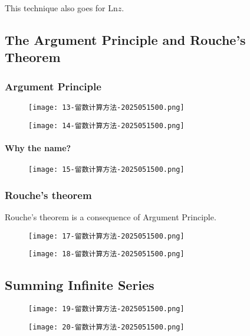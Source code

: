 This technique also goes for $\mathrm{Ln}z$.

\subsection{The Argument Principle and Rouche's Theorem}

\subsubsection{Argument Principle}

\begin{figure}[H]
\centering
\texttt{[image: 13-留数计算方法-2025051500.png]}
\label{}
\end{figure}
\begin{figure}[H]
\centering
\texttt{[image: 14-留数计算方法-2025051500.png]}
\label{}
\end{figure}

\paragraph{Why the name?}

\begin{figure}[H]
\centering
\texttt{[image: 15-留数计算方法-2025051500.png]}
\label{}
\end{figure}

\subsubsection{Rouche's theorem}

Rouche's theorem is a consequence of Argument Principle.

\begin{figure}[H]
\centering
\texttt{[image: 17-留数计算方法-2025051500.png]}
\label{}
\end{figure}
\begin{figure}[H]
\centering
\texttt{[image: 18-留数计算方法-2025051500.png]}
\label{}
\end{figure}

\subsection{Summing Infinite Series}

\begin{figure}[H]
\centering
\texttt{[image: 19-留数计算方法-2025051500.png]}
\label{}
\end{figure}
\begin{figure}[H]
\centering
\texttt{[image: 20-留数计算方法-2025051500.png]}
\label{}
\end{figure}

